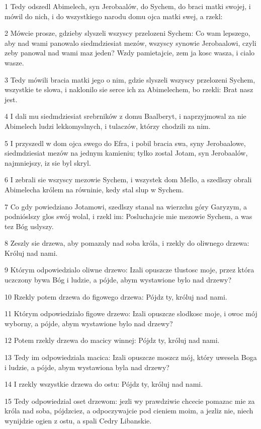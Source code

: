 \par 1 Tedy odszedl Abimelech, syn Jerobaalów, do Sychem, do braci matki swojej, i mówil do nich, i do wszystkiego narodu domu ojca matki swej, a rzekl:
\par 2 Mówcie prosze, gdzieby slyszeli wszyscy przelozeni Sychem: Co wam lepszego, aby nad wami panowalo siedmdziesiat mezów, wszyscy synowie Jerobaalowi, czyli zeby panowal nad wami maz jeden? Wzdy pamietajcie, zem ja kosc wasza, i cialo wasze.
\par 3 Tedy mówili bracia matki jego o nim, gdzie slyszeli wszyscy przelozeni Sychem, wszystkie te slowa, i naklonilo sie serce ich za Abimelechem, bo rzekli: Brat nasz jest.
\par 4 I dali mu siedmdziesiat srebrników z domu Baalberyt, i naprzyjmowal za nie Abimelech ludzi lekkomyslnych, i tulaczów, którzy chodzili za nim.
\par 5 I przyszedl w dom ojca swego do Efra, i pobil bracia swa, syny Jerobaalowe, siedmdziesiat mezów na jednym kamieniu; tylko zostal Jotam, syn Jerobaalów, najmniejszy, iz sie byl skryl.
\par 6 I zebrali sie wszyscy mezowie Sychem, i wszystek dom Mello, a szedlszy obrali Abimelecha królem na równinie, kedy stal slup w Sychem.
\par 7 Co gdy powiedziano Jotamowi, szedlszy stanal na wierzchu góry Garyzym, a podnióslszy glos swój wolal, i rzekl im: Posluchajcie mie mezowie Sychem, a was tez Bóg uslyszy.
\par 8 Zeszly sie drzewa, aby pomazaly nad soba króla, i rzekly do oliwnego drzewa: Króluj nad nami.
\par 9 Którym odpowiedzialo oliwne drzewo: Izali opuszcze tlustosc moje, przez która uczczony bywa Bóg i ludzie, a pójde, abym wystawione bylo nad drzewy?
\par 10 Rzekly potem drzewa do figowego drzewa: Pójdz ty, króluj nad nami.
\par 11 Którym odpowiedzialo figowe drzewo: Izali opuszcze slodkosc moje, i owoc mój wyborny, a pójde, abym wystawione bylo nad drzewy?
\par 12 Potem rzekly drzewa do macicy winnej: Pójdz ty, króluj nad nami.
\par 13 Tedy im odpowiedziala macica: Izali opuszcze moszcz mój, który uwesela Boga i ludzie, a pójde, abym wystawiona byla nad drzewy?
\par 14 I rzekly wszystkie drzewa do ostu: Pójdz ty, króluj nad nami.
\par 15 Tedy odpowiedzial oset drzewom: jezli wy prawdziwie chcecie pomazac mie za króla nad soba, pójdzciez, a odpoczywajcie pod cieniem moim, a jezliz nie, niech wynijdzie ogien z ostu, a spali Cedry Libanskie.
